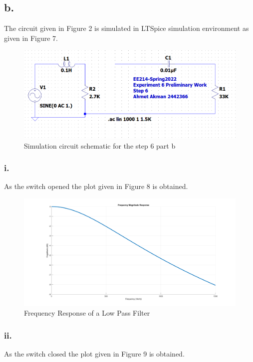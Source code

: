 \documentclass[letterpaper,12pt]{article}
\begin{document}
\subsection{b.}
The  circuit given in Figure 2 is simulated in LTSpice simulation environment as given in Figure 7.
\begin{figure}[H]
    \centering
    \includegraphics[width=1\textwidth]{6bSim.png}
    \caption{Simulation circuit schematic for the step 6 part b}
\end{figure} 

\subsubsection{i.}
As the switch opened the plot given in Figure 8 is obtained.
\begin{figure}[H]
    \centering
    \includegraphics[width=1\textwidth]{6_2_1.png}
    \caption{Frequency Response of a Low Pass Filter}
\end{figure} 


\subsubsection{ii.}
As the switch closed the plot given in Figure 9 is obtained.
\end{document}

